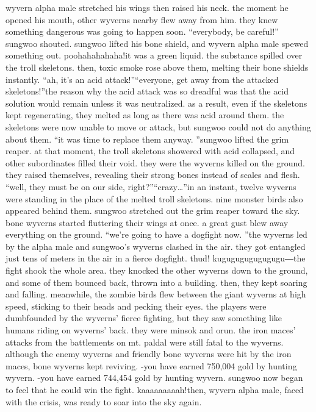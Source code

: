 wyvern alpha male stretched his wings then raised his neck.
 the moment he opened his mouth, other wyverns nearby flew away from him.
 they knew something dangerous was going to happen soon.
“everybody, be careful!” sungwoo shouted.
sungwoo lifted his bone shield, and wyvern alpha male spewed something out.
poohahahahaha!it was a green liquid.
 the substance spilled over the troll skeletons.
 then, toxic smoke rose above them, melting their bone shields instantly.
“ah, it’s an acid attack!”“everyone, get away from the attacked skeletons!”the reason why the acid attack was so dreadful was that the acid solution would remain unless it was neutralized.
 as a result, even if the skeletons kept regenerating, they melted as long as there was acid around them.
 the skeletons were now unable to move or attack, but sungwoo could not do anything about them.
“it was time to replace them anyway.
”sungwoo lifted the grim reaper.
 at that moment, the troll skeletons showered with acid collapsed, and other subordinates filled their void.
they were the wyverns killed on the ground.
 they raised themselves, revealing their strong bones instead of scales and flesh.
“well, they must be on our side, right?”“crazy…”in an instant, twelve wyverns were standing in the place of the melted troll skeletons.
 nine monster birds also appeared behind them.
sungwoo stretched out the grim reaper toward the sky.
 bone wyverns started fluttering their wings at once.
 a great gust blew away everything on the ground.
“we’re going to have a dogfight now.
”the wyverns led by the alpha male and sungwoo’s wyverns clashed in the air.
they got entangled just tens of meters in the air in a fierce dogfight.
thud! kugugugugugugugu―the fight shook the whole area.
 they knocked the other wyverns down to the ground, and some of them bounced back, thrown into a building.
 then, they kept soaring and falling.
meanwhile, the zombie birds flew between the giant wyverns at high speed, sticking to their heads and pecking their eyes.
the players were dumbfounded by the wyverns’ fierce fighting, but they saw something like humans riding on wyverns’ back.
 they were minsok and orun.
the iron maces’ attacks from the battlements on mt.
 paldal were still fatal to the wyverns.
 although the enemy wyverns and friendly bone wyverns were hit by the iron maces, bone wyverns kept reviving.
-you have earned 750,004 gold by hunting wyvern.
-you have earned 744,454 gold by hunting wyvern.
sungwoo now began to feel that he could win the fight.
kaaaaaaaaah!then, wyvern alpha male, faced with the crisis, was ready to soar into the sky again.
